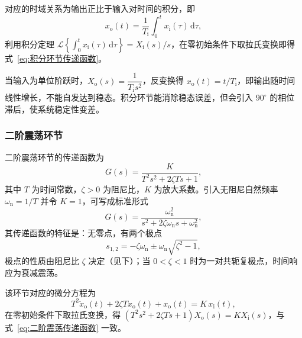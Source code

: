 对应的时域关系为输出正比于输入对时间的积分，即
\begin{equation}
    x_{\mathrm{o}}(t)=\frac{1}{T_{\mathrm{i}}}\int_{0}^{t}x_{\mathrm{i}}(\tau)\,\mathrm{d}\tau,
    \label{eq:积分环节时域}
\end{equation}
利用积分定理 $\mathcal{L}\left\{\int_{0}^{t}x_{\mathrm{i}}(\tau)\,\mathrm{d}\tau\right\}=X_{\mathrm{i}}(s)/s$，在零初始条件下取拉氏变换即得式~\eqref{eq:积分环节传递函数}。

\begin{property}[积分作用的特性]
    当输入为单位阶跃时，$X_{\mathrm{o}}(s)=\dfrac{1}{T_{\mathrm{i}}s^{2}}$，反变换得 $x_{\mathrm{o}}(t)=t/T_{\mathrm{i}}$，即输出随时间线性增长，不能自发达到稳态。积分环节能消除稳态误差，但会引入 $90^{\circ}$ 的相位滞后，使系统稳定性变差。
\end{property}

\subsubsection{二阶震荡环节}

\begin{definition}[二阶震荡环节]
    二阶震荡环节的传递函数为
    \begin{equation}
        G(s)=\frac{K}{T^{2}s^{2}+2\zeta Ts+1},
        \label{eq:二阶震荡传递函数}
    \end{equation}
    其中 $T$ 为时间常数，$\zeta>0$ 为阻尼比，$K$ 为放大系数。引入无阻尼自然频率 $\omega_{\mathrm{n}}=1/T$ 并令 $K=1$，可写成标准形式
    \begin{equation}
        G(s)=\frac{\omega_{\mathrm{n}}^{2}}{s^{2}+2\zeta\omega_{\mathrm{n}}s+\omega_{\mathrm{n}}^{2}},
        \label{eq:二阶标准形式}
    \end{equation}
    其传递函数的特征是：无零点，有两个极点
    \[
    s_{1,2}=-\zeta\omega_{\mathrm{n}}\pm\omega_{\mathrm{n}}\sqrt{\zeta^{2}-1},
    \]
    极点的性质由阻尼比 $\zeta$ 决定（见下）；当 $0<\zeta<1$ 时为一对共轭复极点，时间响应为衰减震荡。
\end{definition}

该环节对应的微分方程为
\begin{equation}
    T^{2}\ddot{x}_{\mathrm{o}}(t)+2\zeta T\dot{x}_{\mathrm{o}}(t)+x_{\mathrm{o}}(t)=K\,x_{\mathrm{i}}(t),
    \label{eq:二阶震荡时域}
\end{equation}
在零初始条件下取拉氏变换，得 $(T^{2}s^{2}+2\zeta Ts+1)X_{\mathrm{o}}(s)=KX_{\mathrm{i}}(s)$，与式~\eqref{eq:二阶震荡传递函数} 一致。

